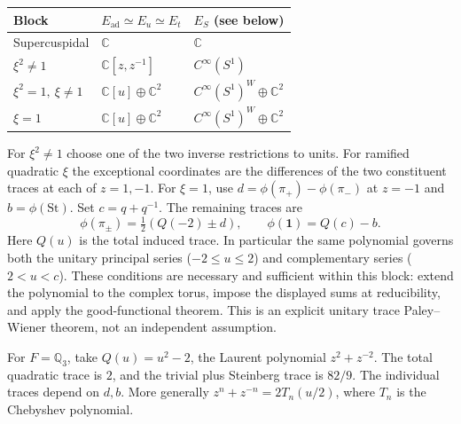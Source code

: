 \begin{center}
\begin{tabular}{lll}
\hline
Block & $E_{\mathrm{ad}}\simeq E_u\simeq E_t$ & $E_S$ (see below)\\
\hline
Supercuspidal & $\mathbb C$ & $\mathbb C$\\
$\xi^2\ne1$ & $\mathbb C[z,z^{-1}]$ & $C^\infty(S^1)$\\
$\xi^2=1,\ \xi\ne1$ & $\mathbb C[u]\oplus\mathbb C^2$ & $C^\infty(S^1)^W\oplus\mathbb C^2$\\
$\xi=1$ & $\mathbb C[u]\oplus\mathbb C^2$ & $C^\infty(S^1)^W\oplus\mathbb C^2$\\
\hline
\end{tabular}
\end{center}
For $\xi^2\ne1$ choose one of the two inverse restrictions to units. For ramified quadratic $\xi$ the exceptional coordinates are the differences of the two constituent traces at each of $z=1,-1$. For $\xi=1$, use $d=\phi(\pi_+)-\phi(\pi_-)$ at $z=-1$ and $b=\phi(\mathrm{St})$. Set $c=q+q^{-1}$. The remaining traces are
\[
\phi(\pi_\pm)=\tfrac12(Q(-2)\pm d),\qquad
\phi(\mathbf 1)=Q(c)-b.
\]
Here $Q(u)$ is the total induced trace. In particular the same polynomial governs both the unitary principal series ($-2\le u\le2$) and complementary series ($2<u<c$). These conditions are necessary and sufficient within this block: extend the polynomial to the complex torus, impose the displayed sums at reducibility, and apply the good-functional theorem. This is an explicit unitary trace Paley--Wiener theorem, not an independent assumption.

\begin{example}
For $F=\mathbb Q_3$, take $Q(u)=u^2-2$, the Laurent polynomial $z^2+z^{-2}$. The total quadratic trace is $2$, and the trivial plus Steinberg trace is $82/9$. The individual traces depend on $d,b$. More generally $z^n+z^{-n}=2T_n(u/2)$, where $T_n$ is the Chebyshev polynomial.
\end{example}
\begin{center}
\end{center}

